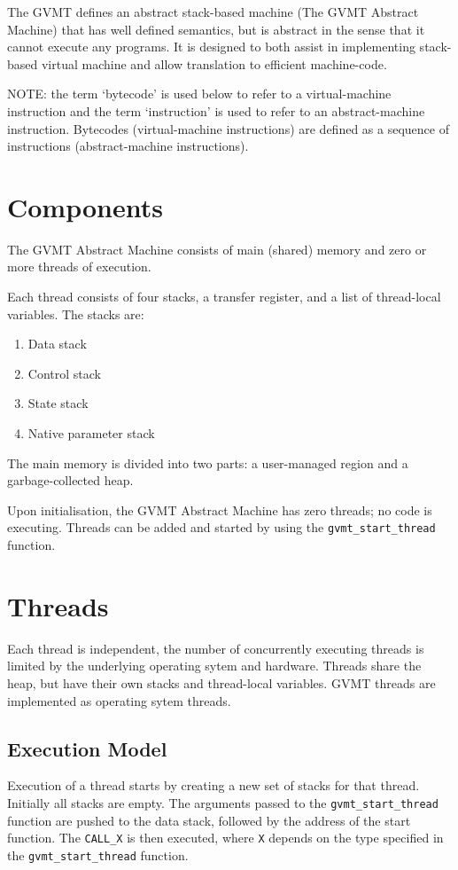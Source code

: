 
The GVMT defines an abstract stack-based machine (The GVMT Abstract Machine) that has well defined semantics, but is abstract in the sense that it cannot execute any programs. It is designed to both assist in implementing stack-based virtual machine and allow translation to efficient machine-code.

NOTE: the term `bytecode' is used below to refer to a virtual-machine instruction and the term `instruction' is used to refer to an abstract-machine instruction. Bytecodes (virtual-machine instructions) are defined as a sequence of instructions (abstract-machine instructions).

\section{Components}
The GVMT Abstract Machine consists of main (shared) memory and zero or more threads of execution.

Each thread consists of four stacks, a transfer register, and a list of thread-local variables. The stacks are:
\begin{enumerate}
\item Data stack
\item Control stack
\item State stack
\item Native parameter stack
\end{enumerate}

The main memory is divided into two parts: a user-managed region and a garbage-collected heap.

Upon initialisation, the GVMT Abstract Machine has zero threads; no code is executing.
Threads can be added and started by using the \verb|gvmt_start_thread| function.

\section{Threads}
Each thread is independent, the number of concurrently executing threads is limited by the underlying operating sytem and hardware. Threads share the heap, but have their own stacks and thread-local variables. GVMT threads are implemented as operating sytem threads.

\subsection{Execution Model}

Execution of a thread starts by creating a new set of stacks for that thread. Initially all stacks are empty. The arguments passed to the  \verb|gvmt_start_thread| function are pushed to the data stack, followed by the address of the start function. The \verb|CALL_X| is then executed, where \verb|X| depends on the type specified in the \verb|gvmt_start_thread| function.

